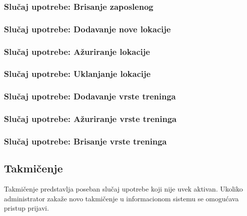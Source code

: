 \documentclass[a4paper]{article}
\begin{document}
\subsubsection{Slučaj upotrebe: Brisanje zaposlenog}



\subsubsection{Slučaj upotrebe: Dodavanje nove lokacije}


\subsubsection{Slučaj upotrebe: Ažuriranje lokacije}


\subsubsection{Slučaj upotrebe: Uklanjanje lokacije}



\subsubsection{Slučaj upotrebe: Dodavanje vrste treninga}


\subsubsection{Slučaj upotrebe: Ažuriranje vrste treninga}


\subsubsection{Slučaj upotrebe: Brisanje vrste treninga}



\newpage
\subsection{Takmičenje}
Takmičenje predstavlja poseban slučaj upotrebe koji nije uvek aktivan. Ukoliko administrator zakaže novo takmičenje u informacionom sistemu se omogućava pristup prijavi. 
\end{document}
